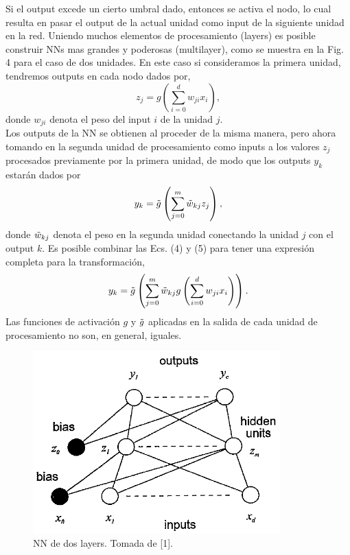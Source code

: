 \documentclass{article}
\begin{document}
Si el output excede un cierto umbral dado, entonces se activa el nodo, lo cual resulta en pasar el output de la actual unidad como input de la siguiente unidad en la red. Uniendo muchos elementos de procesamiento (layers) es posible construir NNs mas grandes y poderosas (multilayer), como se muestra en la Fig. 4 para el caso de dos unidades. En este caso si consideramos la primera unidad, tendremos outputs  en cada nodo dados por,
\begin{equation}
    z_j=g \left( \sum_{i=0}^d w_{ji} x_i\right),
\end{equation}
donde $w_{ji}$ denota el peso del input $i$ de la unidad $j$.\\

Los outputs de la NN se obtienen al proceder de la misma manera, pero ahora tomando en la segunda unidad de procesamiento como inputs a los valores $z_j$ procesados previamente por la primera unidad, de modo que los outputs $y_k$ estarán dados por
\begin{equation}
    y_k=\Tilde{g} \left( \sum_{j=0}^m \Tilde{w}_{kj} z_j\right),
\end{equation}
donde $\Tilde{w}_{kj}$ denota el peso en la segunda unidad conectando la unidad $j$ con el output $k$. Es posible combinar las Ecs. (4) y (5) para tener una expresión completa para la transformación,
\begin{equation}
    y_k=\Tilde{g} \left( \sum_{j=0}^m \Tilde{w}_{kj} g \left( \sum_{i=0}^d w_{ji} x_i\right)\right).
\end{equation}
Las funciones de activación $g$ y $\Tilde{g}$ aplicadas en la salida de cada unidad de procesamiento no son, en general, iguales.\\

\begin{figure}[th!]
   \includegraphics[width=0.85\textwidth]{two.png}
   \caption{NN de dos layers. Tomada de [1].}
\end{figure}
\end{document}

